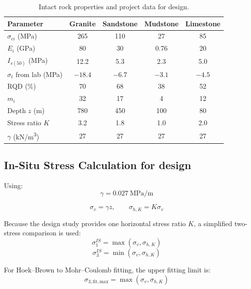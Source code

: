 \begin{table}[H]
\centering
\small
\begin{tabularx}{\textwidth}{l c c c c}
\toprule
\textbf{Parameter} & \textbf{Granite} & \textbf{Sandstone} & \textbf{Mudstone} & \textbf{Limestone} \\
\midrule
\(\sigma_{ci}\) (MPa) & 265 & 110 & 27 & 85 \\
\(E_i\) (GPa) & 80 & 30 & 0.76 & 20 \\
\(I_{s(50)}\) (MPa) & 12.2 & 5.3 & 2.3 & 5.0 \\
\(\sigma_t\) from lab (MPa) & \(-18.4\) & \(-6.7\) & \(-3.1\) & \(-4.5\) \\
RQD (\%) & 70 & 68 & 38 & 52 \\
\(m_i\) & 32 & 17 & 4 & 12 \\
\midrule
Depth \(z\) (m) & 780 & 450 & 100 & 80 \\
Stress ratio \(K\) & 3.2 & 1.8 & 1.0 & 2.0 \\
\(\gamma\) (kN/m\textsuperscript{3}) & 27 & 27 & 27 & 27 \\
\bottomrule
\end{tabularx}
\caption{Intact rock properties and project data for design.}
\end{table}

\subsection{In-Situ Stress Calculation for design}

Using:
\[
\gamma = 0.027~\text{MPa/m}
\]

\[
\sigma_v = \gamma z,
\qquad
\sigma_{h,K} = K\sigma_v
\]

Because the design study provides one horizontal stress ratio \(K\), a simplified two-stress
comparison is used:
\[
\sigma_1^{IS}=\max(\sigma_v,\sigma_{h,K})
\]
\[
\sigma_3^{IS}=\min(\sigma_v,\sigma_{h,K})
\]

For Hoek--Brown to Mohr--Coulomb fitting, the upper fitting limit is:
\[
\sigma_{3,\mathrm{fit,max}}=\max(\sigma_v,\sigma_{h,K})
\]

